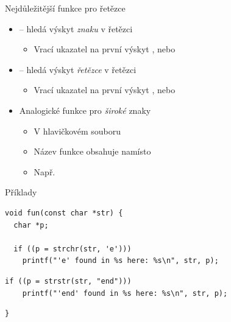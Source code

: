 \begin{frame}[fragile]{Nejdůležitější funkce pro řetězce}

  \begin{itemize}
    \item {} -- hledá výskyt \emph{znaku}  v řetězci
    \begin{itemize}
      \item Vrací ukazatel na první výskyt , nebo 
    \end{itemize}

    \pause

    \item {} -- hledá výskyt \emph{řetězce}  v řetězci
    \begin{itemize}
      \item Vrací ukazatel na první výskyt , nebo 
    \end{itemize}

    \pause

    \item Analogické funkce pro \emph{široké} znaky
    \begin{itemize}
      \item V hlavičkovém souboru 
      \item Název funkce obsahuje  namísto 

      \pause

      \item Např.\ 
    \end{itemize}

  \end{itemize}


  \begin{block}{Příklady}
\begin{lstlisting}[belowskip=0pt]
void fun(const char *str) {
  char *p;

  if ((p = strchr(str, 'e')))
    printf("'e' found in %s here: %s\n", str, p);
\end{lstlisting}
\begin{lstlisting}[belowskip=0pt]
  if ((p = strstr(str, "end")))
    printf("'end' found in %s here: %s\n", str, p);
\end{lstlisting}
\begin{lstlisting}[aboveskip=0pt]
}
\end{lstlisting}
  \end{block}

\end{frame}


